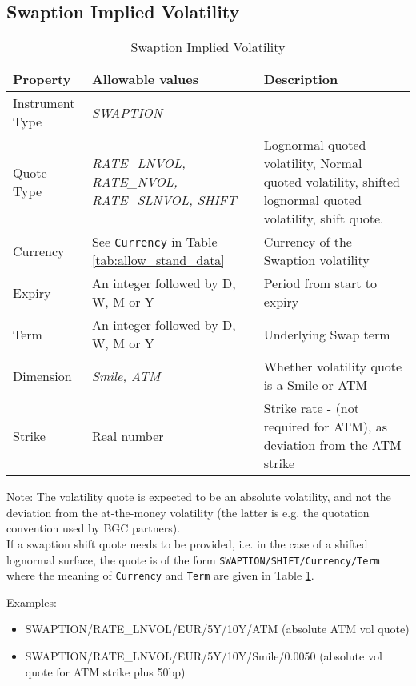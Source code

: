 \subsection{Swaption Implied Volatility}

\begin{table}[H]
\centering
  \begin{tabular}{|p{3cm}|p{3.5cm}|p{7cm}|}
    \hline
    {\bf Property} & {\bf Allowable values} & {\bf Description} \\ \hline
    Instrument Type & \emph{SWAPTION} & \\ \hline
    Quote Type & \emph{RATE\_LNVOL, RATE\_NVOL, RATE\_SLNVOL, SHIFT} & Lognormal quoted volatility, Normal quoted volatility, shifted lognormal quoted volatility, shift quote.\\ \hline
    Currency & See \lstinline!Currency! in Table \ref{tab:allow_stand_data}&  Currency of the Swaption volatility\\ \hline
    Expiry & An integer followed by D, W, M or Y & Period from start to expiry \\ \hline
    Term & An integer followed by D, W, M or Y & Underlying Swap term \\ \hline
    Dimension & \emph{Smile, ATM}  & Whether volatility quote is a Smile or ATM \\ \hline
    Strike & Real number & Strike rate - (not required for ATM), as deviation from the ATM strike\\ \hline
  \end{tabular}
  \caption{Swaption Implied Volatility}
  \label{tab:swaptimplvol_quote}
\end{table}


\medskip Note: The volatility quote is expected to be an absolute volatility, and not the deviation from the
at-the-money volatility (the latter is e.g. the quotation convention used by BGC partners).\\
If a swaption shift quote needs to be provided, i.e. in the case of a shifted lognormal surface, the quote is of the form \lstinline!SWAPTION/SHIFT/Currency/Term! where the meaning of \lstinline!Currency! and \lstinline!Term! are given in Table \ref{tab:swaptimplvol_quote}.


\medskip
Examples:
\begin{itemize}
\item { SWAPTION/RATE\_LNVOL/EUR/5Y/10Y/ATM} (absolute ATM vol quote)
\item { SWAPTION/RATE\_LNVOL/EUR/5Y/10Y/Smile/0.0050} (absolute vol quote for ATM strike plus 50bp)
\end{itemize}

